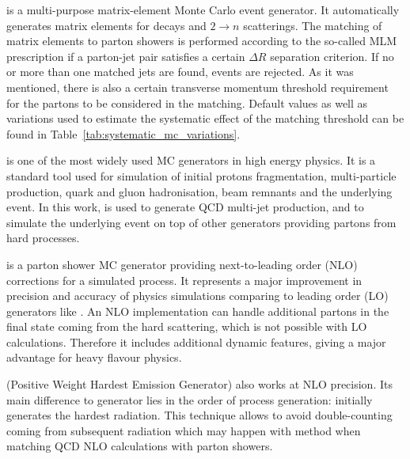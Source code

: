 \begin{description}[wide=\parindent, style=standard, labelsep=0pt]
\item [\MADGRAPH] \autocite{MadGraph} is a multi-purpose matrix-element Monte Carlo event generator. It automatically
generates matrix elements for decays and $2 \rightarrow n$ scatterings. The matching of matrix elements to parton
showers is performed according to the so-called MLM prescription \autocite{MLM} if a parton-jet pair satisfies a certain
$\Delta R$ separation criterion. If no or more than one matched jets are found, events are rejected. As it was
mentioned, there is also a certain transverse momentum threshold requirement for the partons to be considered in the
matching. Default values as well as variations used to estimate the systematic effect of the matching threshold can be
found in Table~\ref{tab:systematic_mc_variations}.

\item [\PYTHIA] \autocite{Pythia,Pythia6.4} is one of the most widely used MC generators in high energy physics. It is a
standard tool used for simulation of initial protons fragmentation, multi-particle production, quark and gluon
hadronisation, beam remnants and the underlying event. In this work, \PYTHIA is used to generate QCD multi-jet
production, and to simulate the underlying event on top of other generators providing partons from hard processes.

\item [\MCATNLO] \autocite{MCatNLO} is a parton shower MC generator providing next-to-leading order (NLO) corrections
for a simulated process. It represents a major improvement in precision and accuracy of physics simulations comparing to
leading order (LO) generators like \PYTHIA. An NLO implementation can handle additional partons in the final state
coming from the hard scattering, which is not possible with LO calculations. Therefore it includes additional dynamic
features, giving a major advantage for heavy flavour physics.

\item [\POWHEG] (Positive Weight Hardest Emission Generator) \autocite{POWHEG} also works at NLO precision. Its main
difference to \MCATNLO generator lies in the order of process generation: \POWHEG initially generates the hardest
radiation. This technique allows to avoid double-counting coming from subsequent radiation which may happen with
\MCATNLO method when matching QCD NLO calculations with parton showers.

\end{description}

